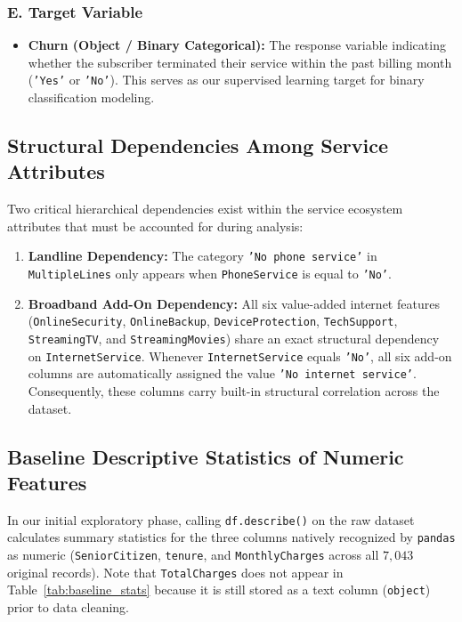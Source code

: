 \subsubsection{E. Target Variable}
\begin{itemize}
    \item \textbf{Churn (Object / Binary Categorical):} The response variable indicating whether the subscriber terminated their service within the past billing month (\texttt{'Yes'} or \texttt{'No'}). This serves as our supervised learning target for binary classification modeling.
\end{itemize}

\subsection{Structural Dependencies Among Service Attributes}
Two critical hierarchical dependencies exist within the service ecosystem attributes that must be accounted for during analysis:
\begin{enumerate}
    \item \textbf{Landline Dependency:} The category \texttt{'No phone service'} in \texttt{MultipleLines} only appears when \texttt{PhoneService} is equal to \texttt{'No'}.
    \item \textbf{Broadband Add-On Dependency:} All six value-added internet features (\texttt{OnlineSecurity}, \texttt{OnlineBackup}, \texttt{DeviceProtection}, \texttt{TechSupport}, \texttt{StreamingTV}, and \texttt{StreamingMovies}) share an exact structural dependency on \texttt{InternetService}. Whenever \texttt{InternetService} equals \texttt{'No'}, all six add-on columns are automatically assigned the value \texttt{'No internet service'}. Consequently, these columns carry built-in structural correlation across the dataset.
\end{enumerate}

\subsection{Baseline Descriptive Statistics of Numeric Features}
In our initial exploratory phase, calling \texttt{df.describe()} on the raw dataset calculates summary statistics for the three columns natively recognized by \texttt{pandas} as numeric (\texttt{SeniorCitizen}, \texttt{tenure}, and \texttt{MonthlyCharges} across all $7,043$ original records). Note that \texttt{TotalCharges} does not appear in Table~\ref{tab:baseline_stats} because it is still stored as a text column (\texttt{object}) prior to data cleaning.

